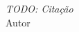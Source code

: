
\chapter*{}
\vspace{15cm}
\begin{flushright}
	\textit
	{
		TODO: Citação
	}\medskip\\ 
	Autor
\end{flushright}